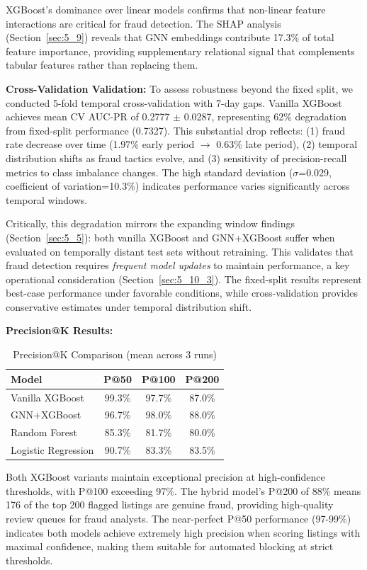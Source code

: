 XGBoost's dominance over linear models confirms that non-linear feature interactions are critical for fraud detection. The SHAP analysis (Section~\ref{sec:5_9}) reveals that GNN embeddings contribute 17.3\% of total feature importance, providing supplementary relational signal that complements tabular features rather than replacing them.

\textbf{Cross-Validation Validation:} To assess robustness beyond the fixed split, we conducted 5-fold temporal cross-validation with 7-day gaps. Vanilla XGBoost achieves mean CV AUC-PR of 0.2777 $\pm$ 0.0287, representing 62\% degradation from fixed-split performance (0.7327). This substantial drop reflects: (1) fraud rate decrease over time (1.97\% early period $\to$ 0.63\% late period), (2) temporal distribution shifts as fraud tactics evolve, and (3) sensitivity of precision-recall metrics to class imbalance changes. The high standard deviation ($\sigma$=0.029, coefficient of variation=10.3\%) indicates performance varies significantly across temporal windows.

Critically, this degradation mirrors the expanding window findings (Section~\ref{sec:5_5}): both vanilla XGBoost and GNN+XGBoost suffer when evaluated on temporally distant test sets without retraining. This validates that fraud detection requires \emph{frequent model updates} to maintain performance, a key operational consideration (Section~\ref{sec:5_10_3}). The fixed-split results represent best-case performance under favorable conditions, while cross-validation provides conservative estimates under temporal distribution shift.

\textbf{Precision@K Results:}

\begin{table}[htbp]
    \centering
    \caption{Precision@K Comparison (mean across 3 runs)}
    \label{tab:5_2}
    \begin{tabular}{lccc}
        \toprule
        Model & P@50 & P@100 & P@200 \\
        \midrule
        Vanilla XGBoost & 99.3\% & 97.7\% & 87.0\% \\
        GNN+XGBoost & 96.7\% & 98.0\% & 88.0\% \\
        Random Forest & 85.3\% & 81.7\% & 80.0\% \\
        Logistic Regression & 90.7\% & 83.3\% & 83.5\% \\
        \bottomrule
    \end{tabular}
\end{table}

Both XGBoost variants maintain exceptional precision at high-confidence thresholds, with P@100 exceeding 97\%. The hybrid model's P@200 of 88\% means 176 of the top 200 flagged listings are genuine fraud, providing high-quality review queues for fraud analysts. The near-perfect P@50 performance (97-99\%) indicates both models achieve extremely high precision when scoring listings with maximal confidence, making them suitable for automated blocking at strict thresholds.
